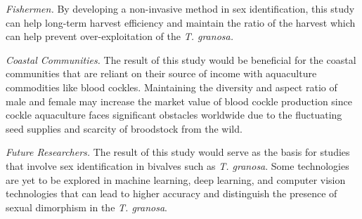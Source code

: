  \textit{Fishermen.} By developing a non-invasive method in sex identification, this study can help long-term harvest efficiency and maintain the ratio of the harvest which can help prevent over-exploitation of the \textit{T. granosa.}

 \textit{Coastal Communities.} The result of this study would be beneficial for the coastal communities that are reliant on their source of income with aquaculture commodities like blood cockles. Maintaining the diversity and aspect ratio of male and female may increase the market value of blood cockle production since cockle aquaculture faces significant obstacles worldwide due to the fluctuating seed supplies and scarcity of broodstock from the wild. 

 \textit{Future Researchers.} The result of this study would serve as the basis for studies that involve sex identification in bivalves such as \textit{T. granosa}. Some technologies are yet to be explored in machine learning, deep learning, and computer vision technologies that can lead to higher accuracy and distinguish the presence of sexual dimorphism in the \textit{T. granosa}.


